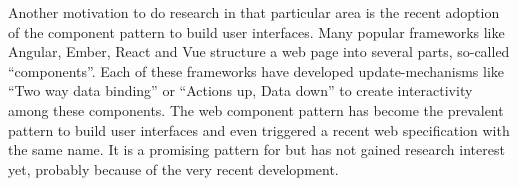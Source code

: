 Another motivation to do research in that particular area is the recent adoption of the component pattern to build user interfaces.
Many popular frameworks like Angular, Ember, React and Vue structure a web page into several parts, so-called ``components''.
Each of these frameworks have developed update-mechanisms like ``Two way data binding'' or ``Actions up, Data down'' to create interactivity among these components.
The web component pattern has become the prevalent pattern to build user interfaces and even triggered a recent web specification with the same name.
It is a promising pattern for \cmvs{} but has not gained research interest yet, probably because of the very recent development.






